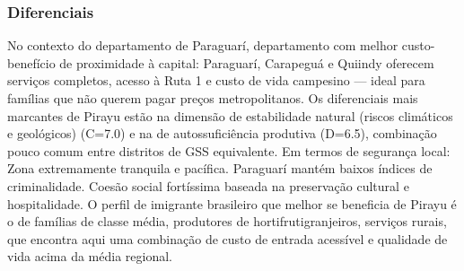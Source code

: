 \subsubsection*{Diferenciais}\label{dif-pirayu-0909}
No contexto do departamento de Paraguarí, departamento com melhor custo-benefício de proximidade à capital: Paraguarí, Carapeguá e Quiindy oferecem serviços completos, acesso à Ruta 1 e custo de vida campesino — ideal para famílias que não querem pagar preços metropolitanos. Os diferenciais mais marcantes de Pirayu estão na dimensão de estabilidade natural (riscos climáticos e geológicos) (C=7.0) e na de autossuficiência produtiva (D=6.5), combinação pouco comum entre distritos de GSS equivalente. Em termos de segurança local: Zona extremamente tranquila e pacífica. Paraguarí mantém baixos índices de criminalidade. Coesão social fortíssima baseada na preservação cultural e hospitalidade. O perfil de imigrante brasileiro que melhor se beneficia de Pirayu é o de famílias de classe média, produtores de hortifrutigranjeiros, serviços rurais, que encontra aqui uma combinação de custo de entrada acessível e qualidade de vida acima da média regional.
